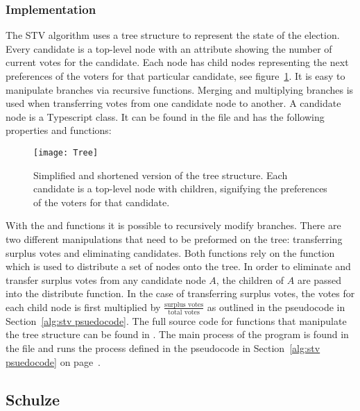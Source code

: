 \documentclass[12pt]{article}
\begin{document}
\subsubsection{Implementation}
The STV algorithm uses a tree structure to represent the state of the election. Every candidate is a top-level node with an attribute showing the number of current votes for the candidate. Each node has child nodes representing the next preferences of the voters for that particular candidate, see figure~\ref{fig:tree structure}. It is easy to manipulate branches via recursive functions. Merging and multiplying branches is used when transferring votes from one candidate node to another. A candidate node is a Typescript class. It can be found in the  file and has the following properties and functions:
\begin{figure}
	\centering
	\texttt{[image: Tree]}
	\caption{Simplified and shortened version of the tree structure. Each candidate is a top-level node with children, signifying the preferences of the voters for that candidate.}
\label{fig:tree structure}
\end{figure}
With the  and  functions it is possible to recursively modify branches. There are two different manipulations that need to be preformed on the tree: transferring surplus votes and eliminating candidates. Both functions rely on the  function which is used to distribute a set of nodes onto the tree.
In order to eliminate and transfer surplus votes from any candidate node $A$, the children of $A$ are passed into the distribute function. In the case of transferring surplus votes, the votes for each child node is first multiplied by $\frac{\text{surplus votes}}{\text{total votes}}$ as outlined in the pseudocode in Section~\ref{alg:stv psuedocode}. The full source code for functions that manipulate the tree structure can be found in .
The main process of the program is found in the  file and runs the process defined in the pseudocode in Section~\ref{alg:stv psuedocode} on page~\pageref{alg:stv psuedocode}.
\subsection{Schulze}
\end{document}
